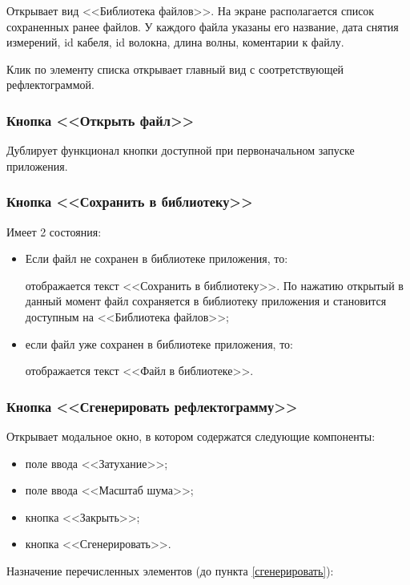Открывает \gls{вид} <<Библиотека файлов>>. На экране располагается список сохраненных ранее файлов. У каждого файла указаны его название, дата снятия измерений, id кабеля, id волокна, длина волны, коментарии к файлу.

Клик по элементу списка открывает главный \gls{вид} с соотретствующей рефлектограммой.

\subsubsection{Кнопка <<Открыть файл>>}

Дублирует функционал кнопки доступной при первоначальном запуске приложения.

\subsubsection{Кнопка <<Сохранить в библиотеку>>}

Имеет 2 состояния:
\begin{itemize}
  \item Если файл не сохранен в библиотеке приложения, то:
  
  отображается текст <<Сохранить в библиотеку>>. По нажатию открытый в данный момент файл сохраняется в библиотеку приложения и становится доступным на  <<Библиотека файлов>>;
  \item если файл уже сохранен в библиотеке приложения, то:
  
  отображается текст <<Файл в библиотеке>>.
\end{itemize}

\subsubsection{Кнопка <<Сгенерировать рефлектограмму>>}

Открывает \gls{модальное окно}, в котором содержатся следующие компоненты:

\begin{itemize}
  \item поле ввода <<Затухание>>;
  \item поле ввода <<Масштаб шума>>;
  \item кнопка <<Закрыть>>;
  \item кнопка <<Сгенерировать>>.
\end{itemize}

Назначение перечисленных элементов (до пункта \ref{сгенерировать}):


